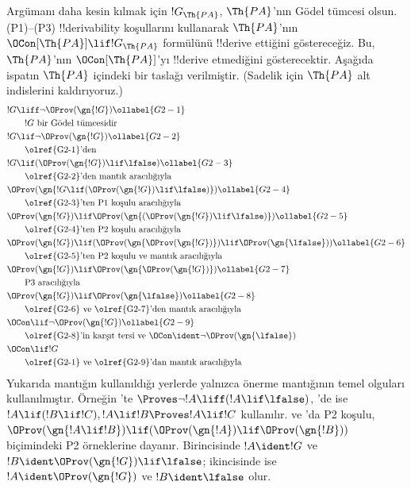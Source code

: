 \documentclass[../../../include/open-logic-section]{subfiles}
\begin{document}
Argümanı daha kesin kılmak için $!G_\Th{PA}$, $\Th{PA}$'nın G\"odel tümcesi
olsun. (P1)--(P3) !!{derivability} koşullarını kullanarak $\Th{PA}$'nın
$\OCon[\Th{PA}] \lif !G_\Th{PA}$ formülünü !!{derive} ettiğini göstereceğiz.
Bu, $\Th{PA}$'nın $\OCon[\Th{PA}]$'yı !!{derive} etmediğini gösterecektir.
Aşağıda ispatın $\Th{PA}$ içindeki bir taslağı verilmiştir. (Sadelik için
$\Th{PA}$ alt indislerini kaldırıyoruz.)
\begin{align}
& !G \liff \lnot \OProv(\gn{!G}) \ollabel{G2-1}\\
& \qquad\text{$!G$ bir G\"odel tümcesidir}\notag \\
& !G \lif \lnot \OProv(\gn{!G}) \ollabel{G2-2}\\
  & \qquad\text{\olref{G2-1}'den} \notag\\
& !G \lif
  (\OProv(\gn{!G}) \lif \lfalse) \ollabel{G2-3}\\
  & \qquad\text{\olref{G2-2}'den mantık aracılığıyla}\notag\\
& \OProv(\gn{
    !G \lif
    (\OProv(\gn{!G}) \lif \lfalse)
  }) \ollabel{G2-4}\\
  & \qquad\text{\olref{G2-3}'ten P1 koşulu aracılığıyla} \notag\\
& \OProv(\gn{!G}) \lif
  \OProv(\gn{
    (\OProv(\gn{!G}) \lif \lfalse)
    }) \ollabel{G2-5}\\
  & \qquad\text{\olref{G2-4}'ten P2 koşulu aracılığıyla} \notag\\
& \OProv(\gn{!G}) \lif (\OProv(\gn{\OProv(\gn{!G})}) \lif \OProv(\gn{\lfalse})) \ollabel{G2-6}\\
  & \qquad\text{\olref{G2-5}'ten P2 koşulu ve mantık aracılığıyla} \notag\\
& \OProv(\gn{!G}) \lif 
  \OProv(\gn{\OProv(\gn{!G})}) \ollabel{G2-7}\\
   & \qquad\text{P3 aracılığıyla} \notag\\
& \OProv(\gn{!G}) \lif \OProv(\gn{\lfalse}) \ollabel{G2-8}\\
  & \qquad \text{\olref{G2-6} ve \olref{G2-7}'den mantık aracılığıyla}\notag\\
& \OCon \lif \lnot \OProv(\gn{!G}) \ollabel{G2-9}\\
  & \qquad\text{\olref{G2-8}'in karşıt tersi ve $\OCon \ident \lnot \OProv(\gn{\lfalse})$}\notag \\
& \OCon \lif !G \notag\\
  & \qquad\text{\olref{G2-1} ve \olref{G2-9}'dan mantık aracılığıyla}\notag
\end{align}
Yukarıda mantığın kullanıldığı yerlerde yalnızca önerme mantığının temel
olguları kullanılmıştır. Örneğin 'te
$\Proves \lnot!A \liff (!A\lif \lfalse)$, 'de ise
$!A \lif (!B \lif !C), !A \lif !B \Proves !A \lif !C$ kullanılır.
 ve 'da P2 koşulu,
$\OProv(\gn{!A \lif !B}) \lif
(\OProv(\gn{!A}) \lif \OProv(\gn{!B}))$ biçimindeki P2 örneklerine dayanır.
Birincisinde $!A \ident !G$ ve
$!B \ident \OProv(\gn{!G}) \lif \lfalse$; ikincisinde ise
$!A \ident \OProv(\gn{!G})$ ve $!B \ident \lfalse$ olur.
\end{document}
